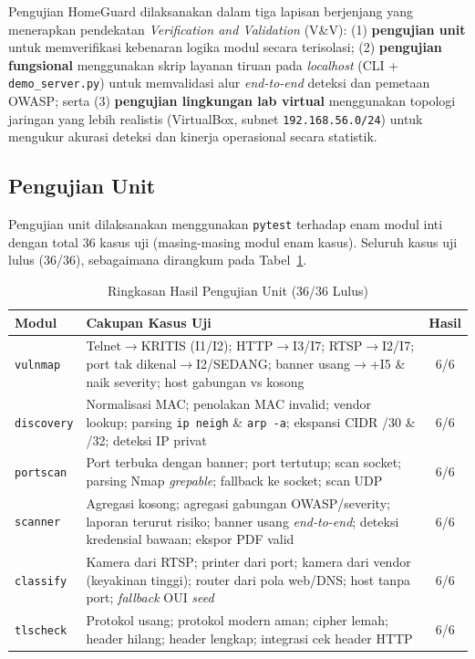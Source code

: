 \documentclass[conference]{IEEEtran}
\begin{document}
Pengujian HomeGuard dilaksanakan dalam tiga lapisan berjenjang yang menerapkan pendekatan \textit{Verification and Validation} (V\&V): (1) \textbf{pengujian unit} untuk memverifikasi kebenaran logika modul secara terisolasi; (2) \textbf{pengujian fungsional} menggunakan skrip layanan tiruan pada \textit{localhost} (CLI + \texttt{demo\_server.py}) untuk memvalidasi alur \textit{end-to-end} deteksi dan pemetaan OWASP; serta (3) \textbf{pengujian lingkungan lab virtual} menggunakan topologi jaringan yang lebih realistis (VirtualBox, subnet \texttt{192.168.56.0/24}) untuk mengukur akurasi deteksi dan kinerja operasional secara statistik.

\subsection{Pengujian Unit}

Pengujian unit dilaksanakan menggunakan \texttt{pytest} terhadap enam modul inti dengan total 36 kasus uji (masing-masing modul enam kasus). Seluruh kasus uji lulus (36/36), sebagaimana dirangkum pada Tabel\ \ref{tab:unit_test}.

\begin{table}[htbp]
\caption{Ringkasan Hasil Pengujian Unit (36/36 Lulus)}
\label{tab:unit_test}
\renewcommand{\arraystretch}{1.2}
\begin{tabularx}{\columnwidth}{|l|X|c|}
\hline
\textbf{Modul} & \textbf{Cakupan Kasus Uji} & \textbf{Hasil} \\
\hline
\texttt{vulnmap} & Telnet$\to$KRITIS (I1/I2); HTTP$\to$I3/I7; RTSP$\to$I2/I7; port tak dikenal$\to$I2/SEDANG; banner usang$\to$+I5 \& naik severity; host gabungan vs kosong & 6/6 \\
\hline
\texttt{discovery} & Normalisasi MAC; penolakan MAC invalid; vendor lookup; parsing \texttt{ip neigh} \& \texttt{arp -a}; ekspansi CIDR /30 \& /32; deteksi IP privat & 6/6 \\
\hline
\texttt{portscan} & Port terbuka dengan banner; port tertutup; scan socket; parsing Nmap \textit{grepable}; fallback ke socket; scan UDP & 6/6 \\
\hline
\texttt{scanner} & Agregasi kosong; agregasi gabungan OWASP/severity; laporan terurut risiko; banner usang \textit{end-to-end}; deteksi kredensial bawaan; ekspor PDF valid & 6/6 \\
\hline
\texttt{classify} & Kamera dari RTSP; printer dari port; kamera dari vendor (keyakinan tinggi); router dari pola web/DNS; host tanpa port; \textit{fallback} OUI \textit{seed} & 6/6 \\
\hline
\texttt{tlscheck} & Protokol usang; protokol modern aman; cipher lemah; header hilang; header lengkap; integrasi cek header HTTP & 6/6 \\
\hline
\end{tabularx}
\end{table}
\end{document}
